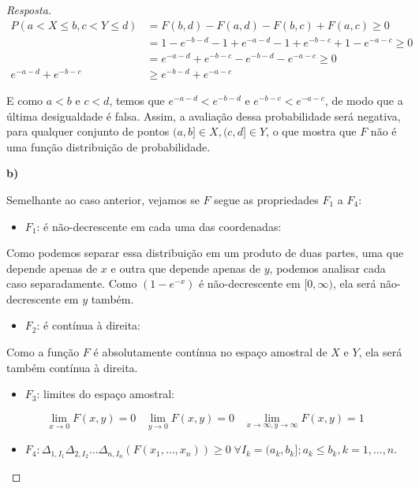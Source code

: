 \documentclass[
]{article}
\providecommand{\tightlist}{%
  \setlength{\itemsep}{0pt}\setlength{\parskip}{0pt}}
\theoremstyle{definition}
\theoremstyle{definition}
\theoremstyle{definition}
\theoremstyle{definition}
\theoremstyle{remark}
\begin{document}
\begin{proof}[Resposta]
\begin{align*}
P(a < X \le b, c < Y \le d) &= F(b,d) - F(a,d) - F(b,c) + F(a,c) \ge 0 \\
&= 1 - e^{-b-d} - 1 + e^{-a-d} - 1 + e^{-b-c} + 1 - e^{-a-c} \ge 0 \\
&= e^{-a-d} + e^{-b-c} - e^{-b-d} - e^{-a-c} \ge 0 \\
e^{-a-d} + e^{-b-c} &\ge e^{-b-d} + e^{-a-c}
\end{align*}

E como \(a < b\) e \(c < d\), temos que \(e^{-a-d} < e^{-b-d}\) e \(e^{-b-c} < e^{-a-c}\), de modo que a última desigualdade é falsa. Assim, a avaliação dessa probabilidade será negativa, para qualquer conjunto de pontos \((a,b] \in X, (c,d] \in Y\), o que mostra que \(F\) não é uma função distribuição de probabilidade.

\textbf{b)}

Semelhante ao caso anterior, vejamos se \(F\) segue as propriedades \(F_{1}\) a \(F_{4}\):

\begin{itemize}
\tightlist
\item
  \(F_{1}\): é não-decrescente em cada uma das coordenadas:
\end{itemize}

Como podemos separar essa distribuição em um produto de duas partes, uma que depende apenas de \(x\) e outra que
depende apenas de \(y\), podemos analisar cada caso separadamente. Como \((1 - e^{-x})\) é não-decrescente em \([0, \infty)\), ela será não-decrescente em \(y\) também.

\begin{itemize}
\tightlist
\item
  \(F_{2}\): é contínua à direita:
\end{itemize}

Como a função \(F\) é absolutamente contínua no espaço amostral de \(X\) e \(Y\), ela será também contínua à direita.

\begin{itemize}
\tightlist
\item
  \(F_{3}\): limites do espaço amostral:
\end{itemize}

\begin{equation*}
\lim_{x \to 0}F(x,y) = 0 \;\;\; \lim_{y \to 0}F(x,y) = 0 \;\;\; \lim_{x \to \infty,y \to \infty}F(x,y) = 1
\end{equation*}

\begin{itemize}
\tightlist
\item
  \(F_{4}: \Delta_{1,I_{1}}\Delta_{2,I_{2}}\ldots\Delta_{n,I_{n}}(F(x_{1},\ldots,x_{n})) \ge 0 \; \forall I_{k} = (a_{k}, b_{k}]; a_{k} \le b_{k}, k=1,\ldots,n\).
\end{itemize}


\end{proof}
\end{document}
